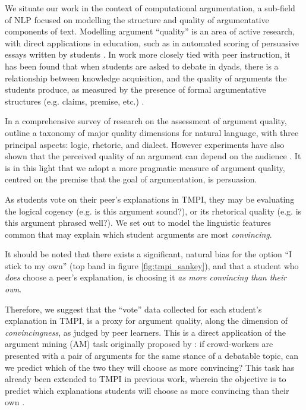 \documentclass[notitlepage,12pt]{jedm}
\begin{document}
We situate our work in the context of computational argumentation, a sub-field 
of NLP focused on modelling the structure and quality of argumentative 
components of text.
Modelling argument ``quality'' is an area of active research, with direct 
applications in education, such as in automated scoring of 
persuasive essays written by students \cite{persing_modeling_2015} 
\cite{nguyen_argument_2018}.
In work more closely tied with peer instruction, it has been found that when 
students are asked to debate in dyads, there is a relationship between  
knowledge acquisition, and the quality of arguments the students produce, as 
measured by the presence of formal argumentative structures (e.g. claims, 
premise, etc.) \cite{garcia-mila_effect_2013}.

In a comprehensive survey of research on the assessment of argument quality, 
\cite{wachsmuth_computational_2017} outline a taxonomy of major quality 
dimensions for natural language, with three principal aspects: logic, rhetoric, 
and dialect. 
However experiments have also shown that the perceived quality of an argument 
can depend on the audience \cite{mercier_why_2011}. 
It is in this light that we adopt a more pragmatic measure of argument quality, 
centred on the premise that the goal of argumentation, is persuasion.

As students vote on their peer's explanations in TMPI, they may be evaluating 
the logical cogency (e.g. is this argument sound?), or its rhetorical quality 
(e.g. is this argument phrased well?). 
We set out to model the linguistic features common that may explain which 
student arguments are most \textit{convincing}.

It should be noted that there exists a significant, natural bias for the option 
``I stick to my own'' (top band in figure \ref{fig:tmpi_sankey}), and that a 
student who \textit{does} choose a peer's explanation, is choosing it 
\textit{as more convincing than their own}.

Therefore, we suggest that the ``vote'' data collected for each student's 
explanation in TMPI, is a proxy for argument quality, along the dimension of 
\textit{convincingness}, as judged by peer learners. 
This is a direct application of the argument mining (AM) task originally 
proposed by \cite{habernal_which_2016}: if crowd-workers are presented with a 
pair of arguments for the same stance of a debatable topic, can we predict 
which of the two they will choose as more convincing?
This task has already been extended to TMPI in previous work, wherein the 
objective is to predict which explanations students will choose as more 
convincing than their own \cite{bhatnagar_learnersourcing_2020}.
\end{document}
